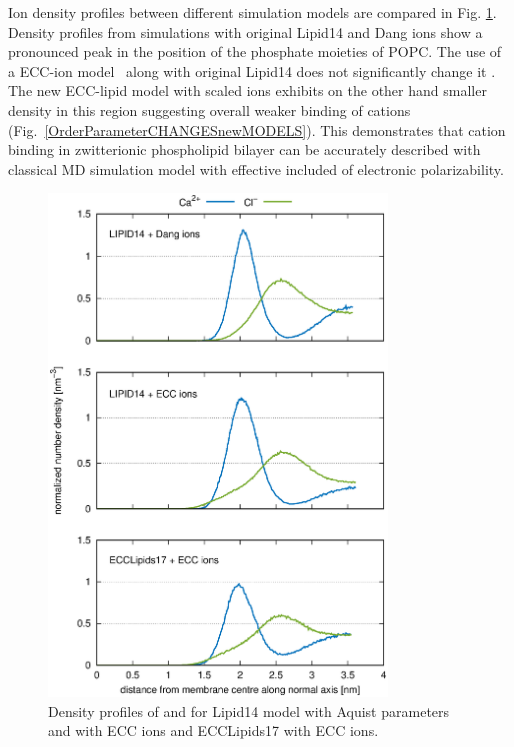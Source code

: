 \documentclass[aip,jcp,twocolumn]{revtex4}
\begin{document}
Ion density profiles between different simulation models are compared in Fig. \ref{fig:cacl-dens}.
Density profiles from simulations with original Lipid14 and Dang ions \cite{smith94,chang1999,dang2006} 
show a pronounced peak in the position of the phosphate moieties of POPC. 
The use of a ECC-ion model~\cite{kohagen14,kohagen16} along with original Lipid14 does not significantly change it
.
The new ECC-lipid model with scaled ions exhibits on the other hand smaller density in this region 
suggesting overall weaker binding of cations (Fig.~\ref{OrderParameterCHANGESnewMODELS}). 
This demonstrates that cation binding in zwitterionic phospholipid bilayer can be accurately
described with classical MD simulation model with effective included of electronic polarizability.
\begin{figure}[]
  \centering
  \includegraphics[width=9.0cm,angle=0]{../Fig/CAdensities.eps}
  \caption{\label{fig:cacl-dens}
    Density profiles of  and  for Lipid14 model with Aquist parameters
    and with ECC ions and ECCLipids17 with ECC ions. }
\end{figure}
\end{document}
